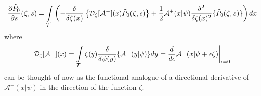 \begin{equation}
\label{functional_WNE_zeroth_order}
    \frac{\partial \Tilde{P}_{0}}{\partial s}(\zeta,s) = \int\limits_{\mathcal{T}}\left(-\frac{\delta}{\delta \zeta(x)}\left\{\mathcal{D}_{\zeta}[\mathcal{A}^{-}](x)\Tilde{P}_{0}(\zeta,s)\right\}+\frac{1}{2}\mathcal{A}^{+}(x|\psi)\frac{\delta^2}{\delta\zeta(x)^2}\{\Tilde{P}_{0}(\zeta,s)\}\right)dx
\end{equation}
where 
\begin{equation*}
\mathcal{D}_{\zeta}[\mathcal{A}^{-}](x) = \int\limits_{\mathcal{T}}\zeta(y)\frac{\delta}{\delta \psi(y)}\{\mathcal{A}^{-}(y|\psi)\}dy = \frac{d}{d\epsilon}\mathcal{A}^-(x|\psi + \epsilon \zeta) \bigg{|}_{\epsilon = 0}
\end{equation*}
can be thought of now as the functional analogue of a directional derivative of $\mathcal{A}^-(x|\psi)$ in the direction of the function $\zeta$.